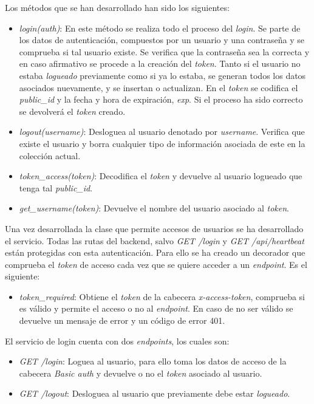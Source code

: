 \bigskip
Los métodos que se han desarrollado han sido los siguientes:
\begin{itemize}
	\item \textit{login(auth)}: En este método se realiza todo el proceso del \textit{login}. Se parte de los datos de autenticación, compuestos por un usuario y una contraseña y se comprueba si tal usuario existe. Se verifica que la contraseña sea la correcta y en caso afirmativo se procede a la creación del \textit{token}. Tanto si el usuario no estaba \textit{logueado} previamente como si ya lo estaba, se generan todos los datos asociados nuevamente, y se insertan o actualizan. En el \textit{token} se codifica el \textit{public\_id} y la fecha y hora de expiración, \textit{exp}. Si el proceso ha sido correcto se devolverá el \textit{token} creado.
	\item \textit{logout(username)}: Desloguea al usuario denotado por \textit{username}. Verifica que existe el usuario y borra cualquier tipo de información asociada de este en la colección actual.
	\item \textit{token\_access(token)}: Decodifica el \textit{token} y devuelve al usuario logueado que tenga tal \textit{public\_id}.
	\item \textit{get\_username(token)}: Devuelve el nombre del usuario asociado al \textit{token}.
\end{itemize}


Una vez desarrollada la clase que permite accesos de usuarios se ha desarrollado el servicio. Todas las rutas del backend, salvo \textit{GET /login} y \textit{GET /api/heartbeat} están protegidas con esta autenticación. Para ello se ha creado un decorador que comprueba el \textit{token} de acceso cada vez que se quiere acceder a un \textit{endpoint}. Es el siguiente:
\begin{itemize}
	\item \textit{token\_required}: Obtiene el \textit{token} de la cabecera \textit{x-access-token}, comprueba si es válido y permite el acceso o no al \textit{endpoint}. En caso de no ser válido se devuelve un mensaje de error y un código de error 401.
\end{itemize}


\pagebreak
El servicio de login cuenta con dos \textit{endpoints}, los cuales son:
\begin{itemize}
	\item \textit{GET /login}: Loguea al usuario, para ello toma los datos de acceso de la cabecera \textit{Basic auth} y devuelve o no el \textit{token} asociado al usuario.
	\item \textit{GET /logout}: Desloguea al usuario que previamente debe estar \textit{logueado}.
\end{itemize}



